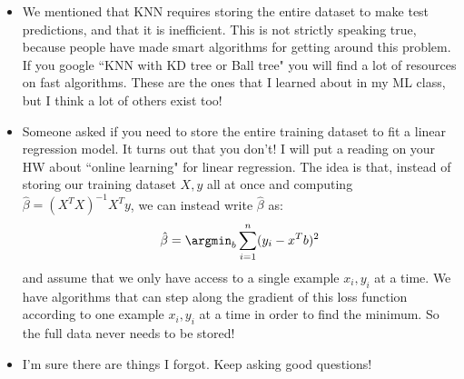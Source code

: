 \begin{itemize}
\begin{itemize}
\begin{itemize}
\end{itemize}
\end{itemize}
\item We mentioned that KNN requires storing the entire dataset to make test predictions, and that it is inefficient. This is not strictly speaking true, because people have made smart algorithms for getting around this problem.
If you google ``KNN with KD tree or Ball tree" you will find a lot of resources on fast algorithms. These are the ones that I learned about in my ML class, but I think a lot of others exist too!
\item Someone asked if you need to store the entire training dataset to fit a linear regression model. It turns out that you don't! I will put a reading on your HW about ``online learning" for linear regression. The idea is that, instead of storing our training dataset $X,y$ all at once and computing $\hat{\beta} = (X^T X)^{-1} X^T y$, we can instead write $\hat{\beta}$ as:
$$
\hat{\beta} = \argmin_b \sum_{i=1}^n (y_i - x^T b)^2
$$
and assume that we only have access to a single example $x_i, y_i$ at a time. We have algorithms that can step along the gradient of this loss function according to one example $x_i, y_i$ at a time in order to find the minimum. So the full data never needs to be stored! 
\item I'm sure there are things I forgot. Keep asking good questions!
\end{itemize}


















